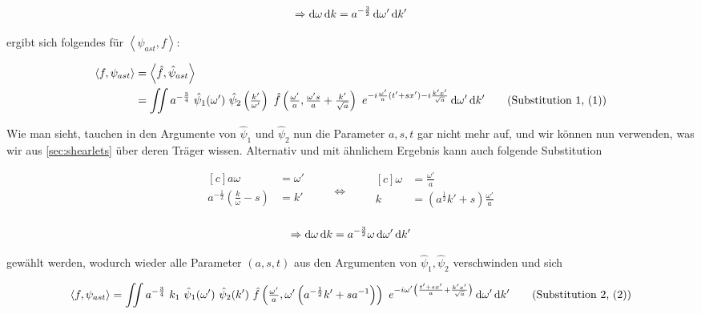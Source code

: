 \begin{equation*}
\Rightarrow
\mathop{}\!\mathrm{d} \omega \mathop{}\!\mathrm{d} k = a^{-\frac{3}{2}} \mathop{}\!\mathrm{d} \omega' \mathop{}\!\mathrm{d} k'
\end{equation*}

ergibt sich folgendes für $\left<\psi_{ast}, f\right>$:

\begin{align}
    \left\langle f , \psi_{ast}\right\rangle
    &=  \left\langle \hat f, \hat\psi_{ast}\right\rangle \nonumber \\
    &=  \iint a^{-\frac{3}{4}}~\hat \psi_1(\omega') ~\hat \psi_2 \left(\tfrac{k'}{\omega'}\right)
    ~\hat f \left(\tfrac{\omega'}{a}, \tfrac{\omega' s}{a} + \tfrac{k'}{\sqrt{a}}\right)
    ~e^{-i\frac{\omega'}{a}(t'+sx') - i \frac{k' x'}{\sqrt a}}
    \d \omega' \d k'
\refstepcounter{equation}
\tag{Substitution 1, (\theequation)}
\label{eq:substitution1}
\end{align}

Wie man sieht, tauchen in den Argumente von $\hat\psi_1$ und $\hat\psi_2$ nun die Parameter $a,s,t$ gar nicht mehr auf, und wir können nun verwenden, was wir aus \eqref{sec:shearlets} über deren Träger wissen.
Alternativ und mit ähnlichem Ergebnis kann auch folgende Substitution

\begin{equation}
\begin{aligned}[c]
a \omega &= \omega'\\
a^{-\frac{1}{2}} \left(\frac{k}{\omega} - s\right) &= k'\\
\end{aligned}
\qquad\Longleftrightarrow\qquad
\begin{aligned}[c]
\omega &= \frac{\omega'}{a}\\
k &= \left( a^{\frac{1}{2}} k' +s \right) \frac{\omega'}{a}\\
\end{aligned}
\label{eq:substitution2_coords}
\end{equation}

\begin{equation*}
\Rightarrow
\mathop{}\!\mathrm{d} \omega \mathop{}\!\mathrm{d} k = a^{-\frac{3}{2}} \omega \mathop{}\!\mathrm{d} \omega' \mathop{}\!\mathrm{d} k'
\end{equation*}

gewählt werden, wodurch wieder alle Parameter $(a,s,t)$ aus den Argumenten von $\hat\psi_1, \hat\psi_2$
verschwinden und sich

\begin{align}
    \left<f, \psi_{ast}\right>
    =  \iint a^{-\frac{3}{4}}~ k_1~ \hat \psi_1(\omega')~ \hat \psi_2 (k')~
    \hat f \left(\tfrac{\omega'}{a}, \omega' \left(a^{-\frac{1}{2}}k' + s a^{-1}\right)\right)
    ~e^{-i \omega' \left(\frac{t'+s x'}{a} + \frac{k' x'}{\sqrt{a}}\right)}
    \d \omega' \d k'
\refstepcounter{equation}
\tag{Substitution 2, (\theequation)}
\label{eq:substitution2}
\end{align}

